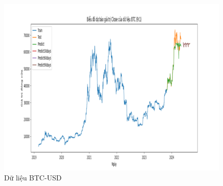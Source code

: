 \documentclass[conference]{IEEEtran}
\begin{document}
\begin{figure}[H]
\begin{minipage}{0.15\textwidth}
    \includegraphics[width=1\textwidth]{Figure/RandomForest_BTC_91.png}
    \end{minipage}
    \caption{Dữ liệu BTC-USD}
    \label{fig:1}
\end{figure}
\end{document}
